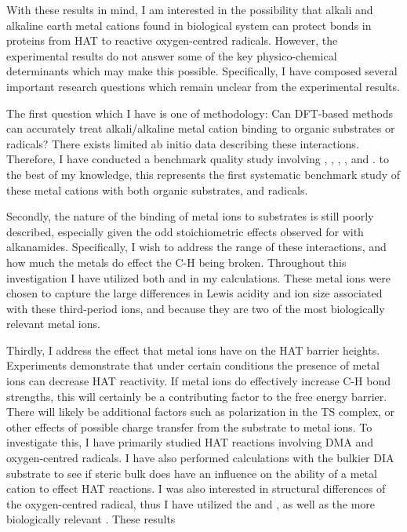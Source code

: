 With these results in mind, I am interested in the possibility that alkali and alkaline earth metal cations found in biological system can protect  bonds in proteins from HAT to reactive oxygen-centred radicals. However, the experimental results do not answer some of the key physico-chemical determinants which may make this possible. Specifically, I have composed several important research questions which remain unclear from the experimental results.

The first question which I have is one of methodology: Can DFT-based methods can accurately treat alkali/alkaline metal cation binding to organic substrates or radicals? There exists limited ab initio data describing these interactions.\cite{ Siu2001, Corral2003, Suarez2011, Baldauf2013} Therefore, I have conducted a benchmark quality study involving , , , , and . to the best of my knowledge, this represents the first systematic benchmark study of these metal cations with both organic substrates, and radicals.

Secondly, the nature of the binding of metal ions to substrates is still poorly described, especially given the odd stoichiometric effects observed for  with alkanamides. Specifically, I wish to address the range of these interactions, and how much the metals do effect the C-H being broken. Throughout this investigation I have utilized both  and  in my calculations. These metal ions were chosen to capture the large differences in Lewis acidity and ion size associated with these third-period ions, and because they are two of the most biologically relevant metal ions.

Thirdly, I address the effect that metal ions have on the HAT barrier heights. Experiments demonstrate that under certain conditions the presence of metal ions can decrease HAT reactivity. If metal ions do effectively increase C-H bond strengths, this will certainly be a contributing factor to the free energy barrier. There will likely be additional factors such as polarization in the TS complex, or other effects of possible charge transfer from the substrate to metal ions. To investigate this, I have primarily studied HAT reactions involving DMA and oxygen-centred radicals. I have also performed calculations with the bulkier DIA substrate to see if steric bulk does have an influence on the ability of a metal cation to effect HAT reactions. I was also interested in structural differences of the oxygen-centred radical, thus I have utilized the \bno and \cumo, as well as the more biologically relevant . These results


